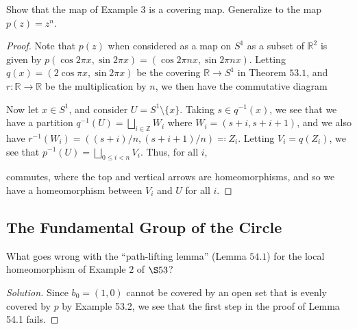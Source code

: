 \documentclass[12pt]{article}
\theoremstyle{remark}
\begin{document}
\setcounter{subsubsection}{4}
\begin{problem}
  Show that the map of Example $3$ is a covering map. Generalize to the map $p(z) = z^n$.
\end{problem}
\begin{proof}
  Note that $p(z)$ when considered as a map on $S^1$ as a subset of
  $\mathbb{R}^2$ is given by $p(\cos 2\pi x,\sin 2\pi x) = (\cos 2\pi nx,\sin
  2\pi nx)$. Letting $q(x) = (2\cos\pi x,\sin 2\pi x)$ be the covering
  $\mathbb{R} \to S^1$ in Theorem $53.1$, and $r\colon \mathbb{R} \to \mathbb{R}$ be the multiplication by $n$, we then have the commutative diagram
  \begin{center}
  \end{center}
  Now let $x \in S^1$, and consider $U = S^1 \setminus \{x\}$. Taking $s \in
  q^{-1}(x)$, we see that we have a partition $q^{-1}(U) = \bigsqcup_{i \in
    \mathbb{Z}} W_i$ where $W_i = (s+i,s+i+1)$, and we also have $r^{-1}(W_i) =
    ((s+i)/n,(s+i+1)/n) \eqqcolon Z_i$. Letting $V_i = q(Z_i)$, we see that $p^{-1}(U) = \bigsqcup_{0\le i<n} V_i$. Thus, for all $i$,
  \begin{center}
  \end{center}
  commutes, where the top and vertical arrows are homeomorphisms, and so we have a homeomorphism between $V_i$ and $U$ for all $i$.
\end{proof}

\subsection{The Fundamental Group of the Circle}
\begin{problem}
  What goes wrong with the ``path-lifting lemma'' (Lemma $54.1$) for the local homeomorphism of Example $2$ of $\S53$?
\end{problem}
\begin{proof}[Solution]
  Since $b_0=(1,0)$ cannot be covered by an open set that is evenly covered by $p$ by Example 53.2, we see that the first step in the proof of Lemma 54.1 fails.
\end{proof}
\end{document}
